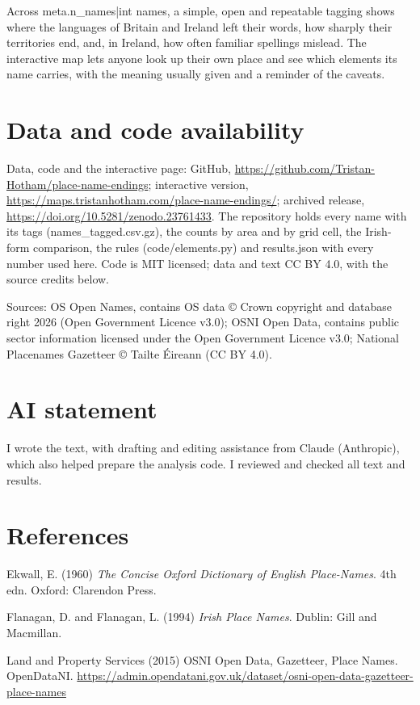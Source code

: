 \documentclass[11pt,a4paper]{article}
\begin{document}
Across {{meta.n_names|int}} names, a simple, open and repeatable tagging shows where the languages of Britain and Ireland left their words, how sharply their territories end, and, in Ireland, how often familiar spellings mislead. The interactive map lets anyone look up their own place and see which elements its name carries, with the meaning usually given and a reminder of the caveats.

\section*{Data and code availability}

Data, code and the interactive page: GitHub, \url{https://github.com/Tristan-Hotham/place-name-endings}; interactive version, \url{https://maps.tristanhotham.com/place-name-endings/}; archived release, \url{https://doi.org/10.5281/zenodo.23761433}. The repository holds every name with its tags (names\_tagged.csv.gz), the counts by area and by grid cell, the Irish-form comparison, the rules (code/elements.py) and results.json with every number used here. Code is MIT licensed; data and text CC BY 4.0, with the source credits below.

Sources: OS Open Names, contains OS data © Crown copyright and database right 2026 (Open Government Licence v3.0); OSNI Open Data, contains public sector information licensed under the Open Government Licence v3.0; National Placenames Gazetteer © Tailte Éireann (CC BY 4.0).

\section*{AI statement}

I wrote the text, with drafting and editing assistance from Claude (Anthropic), which also helped prepare the analysis code. I reviewed and checked all text and results.

\section*{References}

\small
\setlength{\parskip}{0.35em}
Ekwall, E. (1960) \textit{The Concise Oxford Dictionary of English Place-Names}. 4th edn. Oxford: Clarendon Press.

Flanagan, D. and Flanagan, L. (1994) \textit{Irish Place Names}. Dublin: Gill and Macmillan.

Land and Property Services (2015) OSNI Open Data, Gazetteer, Place Names. OpenDataNI. \url{https://admin.opendatani.gov.uk/dataset/osni-open-data-gazetteer-place-names}
\end{document}
